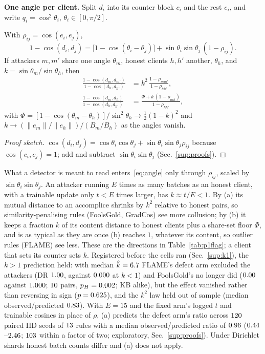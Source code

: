 \documentclass[journal]{IEEEtran}
\begin{document}
\textbf{One angle per client.} Split $d_i$ into its counter block $c_i$ and the rest
$e_i$, and write $q_i=\cos^2\theta_i$, $\theta_i\in[0,\pi/2]$.

\begin{proposition}
\label{prop:angle}
With $\rho_{ij}=\cos(e_i,e_j)$,
\begin{equation}
\label{eq:angle}
1-\cos(d_i,d_j)=\big[1-\cos(\theta_i-\theta_j)\big]+\sin\theta_i\sin\theta_j\,(1-\rho_{ij}).
\end{equation}
If attackers $m,m'$ share one angle $\theta_m$, honest clients $h,h'$ another,
$\theta_h$, and $k=\sin\theta_m/\sin\theta_h$, then
\begin{align}
\frac{1-\cos(d_m,d_{m'})}{1-\cos(d_h,d_{h'})}&=k^2\,\frac{1-\rho_{mm'}}{1-\rho_{hh'}},\tag{a}\\
\frac{1-\cos(d_m,d_h)}{1-\cos(d_h,d_{h'})}&=\frac{\Phi+k\,(1-\rho_{mh})}{1-\rho_{hh'}},\tag{b}
\end{align}
with $\Phi=[1-\cos(\theta_m-\theta_h)]/\sin^2\theta_h\to\tfrac12(1-k)^2$ and
$k\to(\|e_m\|/\|e_h\|)/(B_m/B_h)$ as the angles vanish.
\end{proposition}
\begin{proof}[Proof sketch]
$\cos(d_i,d_j)=\cos\theta_i\cos\theta_j+\sin\theta_i\sin\theta_j\rho_{ij}$ because
$\cos(c_i,c_j)=1$; add and subtract $\sin\theta_i\sin\theta_j$ (Sec.~\ref{sup:proofs}).
\end{proof}

What a detector is meant to read enters~\eqref{eq:angle} only through $\rho_{ij}$,
scaled by $\sin\theta_i\sin\theta_j$. An attacker running $E$ times as many batches as
an honest client, with a trainable update only $t<E$ times larger, has $k\approx t/E<1$.
By (a) its mutual distance to an accomplice shrinks by $k^2$ relative to honest pairs, so
similarity-penalising rules (FoolsGold, GradCos) see more collusion; by (b) it keeps a
fraction $k$ of its content distance to honest clients plus a share-set floor $\Phi$, and
is as typical as they are once (b) reaches $1$, whatever its content, so outlier rules
(FLAME) see less. These are the directions in Table~\ref{tab:p1flag}; a client that sets its counter sets $k$.
Registered before the cells ran (Sec.~\ref{sup:k1}), the $k>1$ prediction held: with
median $\hat k=6.7$ FLAME's defect arm excluded the attackers (DR $1.00$, against
$0.000$ at $k<1$) and FoolsGold's no longer did ($0.00$ against
$1.000$; $10$ pairs, $p_H=0.002$; KB alike), but the effect vanished rather
than reversing in sign ($p=0.625$), and the $k^2$ law held out of sample (median
observed/predicted $0.83$). With $E=15$ and the fixed
arm's logged $t$ and trainable cosines in place of $\rho$, (a) predicts the defect arm's ratio across $120$ paired IID seeds of
$13$ rules with a median observed/predicted ratio of $0.96$
($0.44$--$2.46$; $103$ within a factor of two; exploratory, Sec.~\ref{sup:proofs}).
Under Dirichlet shards honest batch counts differ and (a) does not apply.
\end{document}
